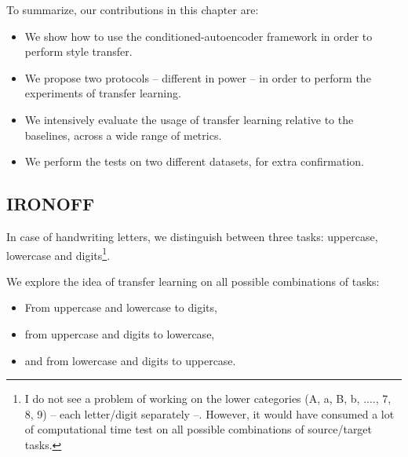   \par To summarize, our contributions in this chapter are:
  \begin{itemize}
    \item We show how to use the conditioned-autoencoder framework in order to perform style transfer.
    \item We propose two protocols -- different in power -- in order to perform the experiments of transfer learning.
    \item We intensively evaluate the usage of transfer learning relative to the baselines, across a wide range of metrics.
    \item We perform the tests on two different datasets, for extra confirmation.
  \end{itemize}

  \subsection{IRONOFF}
    \par In case of handwriting letters, we distinguish between three tasks: uppercase, lowercase and digits\footnote{I do not see a problem of working on the lower categories (A, a, B, b, ...., 7, 8, 9) -- each letter/digit separately --. However, it would have consumed a lot of computational time test on all possible combinations of source/target tasks.}.
    \par We explore the idea of transfer learning on all possible combinations of tasks:
    \begin{itemize}
      \item From uppercase and lowercase to digits,
      \item from uppercase and digits to lowercase,
      \item and from lowercase and digits to uppercase.
    \end{itemize}

